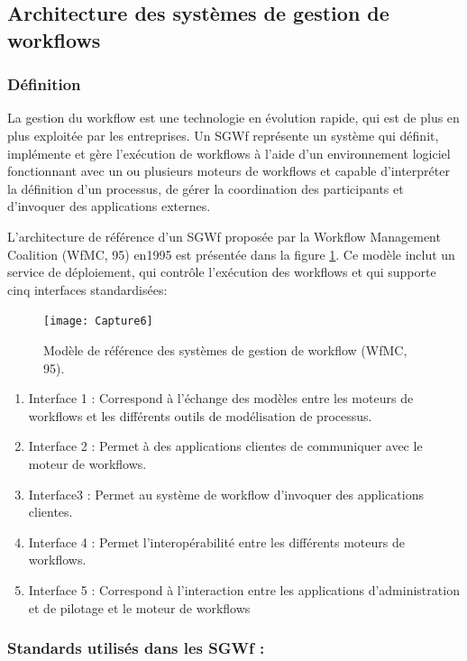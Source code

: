 \subsection{Architecture des systèmes de gestion de workflows }
\subsubsection{Définition }
La gestion du workflow est une technologie en évolution rapide, qui est de plus en plus exploitée par les entreprises. Un SGWf représente un système qui définit, implémente et gère l'exécution de workflows à l'aide d'un environnement logiciel fonctionnant avec un ou plusieurs moteurs de workflows et capable d'interpréter la définition d'un processus, de gérer la coordination des participants et d'invoquer des applications externes.  

 L'architecture de référence d’un SGWf proposée par la Workflow Management Coalition (WfMC, 95) en1995 est présentée dans la figure \ref{fig:capture6}. Ce modèle inclut un service de déploiement, qui contrôle l'exécution des workflows et qui supporte cinq interfaces standardisées:
 
 
\begin{figure}[!h]
	\centering
	\texttt{[image: Capture6]}
	\caption{ Modèle de référence des systèmes de gestion de workflow (WfMC, 95). }
	\label{fig:capture6}
\end{figure}


\begin{enumerate}
\item  Interface 1 : Correspond à l’échange des modèles entre les moteurs de workflows et les différents outils de modélisation de processus. \item Interface 2 : Permet à des applications clientes de communiquer avec le moteur de workflows. \item Interface3 : Permet au système de workflow d’invoquer des applications clientes. \item  Interface 4 : Permet l’interopérabilité entre les différents moteurs de workflows.\item  Interface 5 : Correspond à l’interaction entre les applications d’administration et de pilotage et le moteur de workflows

\end{enumerate}
\subsubsection{Standards utilisés dans les SGWf :}

